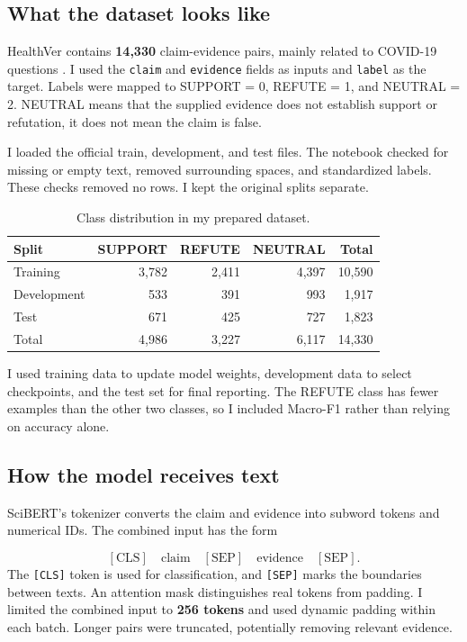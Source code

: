 \documentclass[11pt,letterpaper]{article}
\begin{document}
\subsection{What the dataset looks like}
HealthVer contains \textbf{14,330} claim-evidence pairs, mainly related to COVID-19 questions \cite{sarrouti}. I used the \texttt{claim} and \texttt{evidence} fields as inputs and \texttt{label} as the target. Labels were mapped to SUPPORT = 0, REFUTE = 1, and NEUTRAL = 2. NEUTRAL means that the supplied evidence does not establish support or refutation, it does not mean the claim is false.

I loaded the official train, development, and test files. The notebook checked for missing or empty text, removed surrounding spaces, and standardized labels. These checks removed no rows. I kept the original splits separate.

\begin{table}[H]
\centering\small
\caption{Class distribution in my prepared dataset.}
\begin{tabular}{@{}lrrrr@{}}\toprule
\textbf{Split} & \textbf{SUPPORT} & \textbf{REFUTE} & \textbf{NEUTRAL} & \textbf{Total}\\\midrule
Training & 3,782 & 2,411 & 4,397 & 10,590\\
Development & 533 & 391 & 993 & 1,917\\
Test & 671 & 425 & 727 & 1,823\\\midrule
Total & 4,986 & 3,227 & 6,117 & 14,330\\\bottomrule
\end{tabular}
\end{table}

I used training data to update model weights, development data to select checkpoints, and the test set for final reporting. The REFUTE class has fewer examples than the other two classes, so I included Macro-F1 rather than relying on accuracy alone.

\subsection{How the model receives text}
SciBERT's tokenizer converts the claim and evidence into subword tokens and numerical IDs. The combined input has the form

\[
[\mathrm{CLS}]\quad\mathrm{claim}\quad[\mathrm{SEP}]\quad\mathrm{evidence}\quad[\mathrm{SEP}].
\]
The \texttt{[CLS]} token is used for classification, and \texttt{[SEP]} marks the boundaries between texts. An attention mask distinguishes real tokens from padding. I limited the combined input to \textbf{256 tokens} and used dynamic padding within each batch. Longer pairs were truncated, potentially removing relevant evidence.
\end{document}

